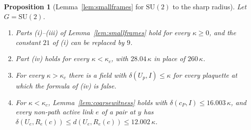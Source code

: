 \documentclass[11pt]{amsart}
\newtheorem{proposition}[theorem]{Proposition}
\theoremstyle{definition}
\theoremstyle{remark}
\numberwithin{equation}{section}
\newcommand{\SU}{\mathrm{SU}}
\begin{document}
\begin{proposition}[Lemma~\ref{lem:smallframes} for $\SU(2)$ to the sharp radius]\label{prop:smallframessharp}
Let $G=\SU(2)$.
\begin{enumerate}[label=\textup{(\roman*)},leftmargin=*]
\item Parts (i)--(iii) of Lemma~\ref{lem:smallframes} hold for every
$\kappa\ge0$, and the constant $21$ of (i) can be replaced by $9$.
\item Part (iv) holds for every $\kappa<\kappa_c$, with $28.04\,\kappa$ in
place of $260\,\kappa$.
\item For every $\kappa>\kappa_c$ there is a field with $\delta(U_p,I)\le
\kappa$ for every plaquette at which the formula of (iv) is false.
\item For $\kappa<\kappa_c$, Lemma~\ref{lem:coarsewitness} holds with
$\delta(c_P,I)\le16.003\,\kappa$, and every non-path active link $e$ of a
pair at $y$ has $\delta(U_e,R_e(c))\le d(U_e,R_e(c))\le12.002\,\kappa$.
\end{enumerate}
\end{proposition}
\end{document}
